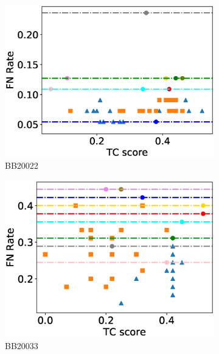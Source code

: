 \begin{figure}[!htbp]
\begin{adjustwidth}{-1cm}{-1cm}
\begin{subfigure}{0.22\textwidth}
			\includegraphics[width=\columnwidth]{Figure/summary/precomputedInit/Balibase/BB20022_fnrate_vs_tc_2}
			\caption{BB20022}
		\end{subfigure}
		\begin{subfigure}{0.22\textwidth}
			\includegraphics[width=\columnwidth]{Figure/summary/precomputedInit/Balibase/BB20033_fnrate_vs_tc_2}
			\caption{BB20033}
		\end{subfigure}	
		\begin{subfigure}{0.22\textwidth}

\end{subfigure}
\end{adjustwidth}
\end{figure}
